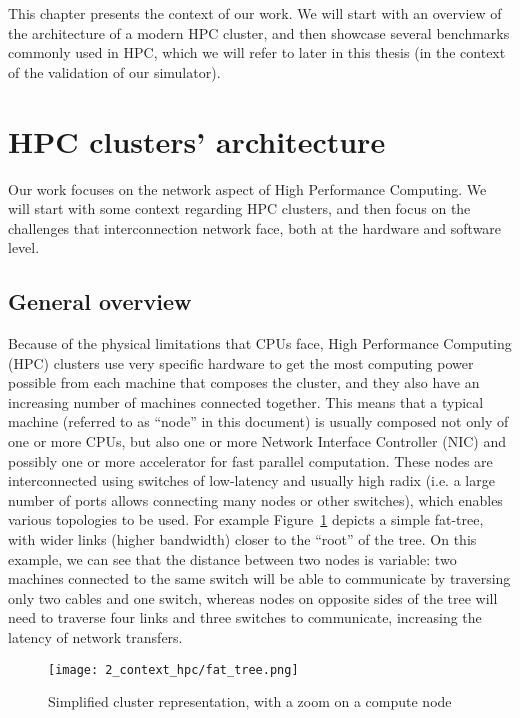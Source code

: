 This chapter presents the context of our work. We will start with an overview of
the architecture of a modern HPC cluster, and then showcase several benchmarks
commonly used in HPC, which we will refer to later in this thesis (in the
context of the validation of our simulator).

\section{HPC clusters' architecture}

Our work focuses on the network aspect of High Performance Computing. We will
start with some context regarding HPC clusters, and then focus on the challenges
that interconnection network face, both at the hardware and software level.

\subsection{General overview}

Because of the physical limitations that CPUs face, High Performance Computing
(HPC) clusters use very specific hardware to get the most computing power
possible from each machine that composes the cluster, and they also have an
increasing number of machines connected together. This means that a typical
machine (referred to as ``node'' in this document) is usually composed not only
of one or more CPUs, but also one or more Network Interface Controller (NIC) and
possibly one or more accelerator for fast parallel computation. These nodes are
interconnected using switches of low-latency and usually high radix (i.e. a large
number of ports allows connecting many nodes or other switches), which enables
various topologies to be used. For example
Figure~\ref{fig:2_context_hpc:FatTree} depicts a simple fat-tree, with wider
links (higher bandwidth) closer to the ``root'' of the tree. On this example, we
can see that the distance between two nodes is variable: two machines connected
to the same switch will be able to communicate by traversing only two cables and
one switch, whereas nodes on opposite sides of the tree will need to traverse
four links and three switches to communicate, increasing the latency of network
transfers.

\begin{figure}[!ht]
    \centering
    \texttt{[image: 2\_context\_hpc/fat\_tree.png]}
    \caption{Simplified cluster representation, with a zoom on a compute node}
    \label{fig:2_context_hpc:FatTree}
\end{figure}

